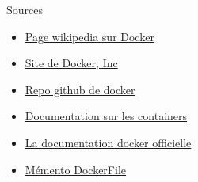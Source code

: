  \begin{frame}{Sources}
 \begin{itemize}
     \item \href{https://en.wikipedia.org/wiki/Docker_(software)}{Page wikipedia sur Docker}
     \item \href{https://www.docker.com/}{Site de Docker, Inc}
     \item \href{https://github.com/docker/docker-ce}{Repo github de docker}
     \item \href{https://www.aquasec.com/wiki/display/containers/}{Documentation sur les containers}
     \item \href{https://docs.docker.com/develop}{La documentation docker officielle}
     \item \href{https://kapeli.com/cheat_sheets/Dockerfile.docset/Contents/Resources/Documents/index}{Mémento DockerFile}
 \end{itemize}
 \end{frame}
